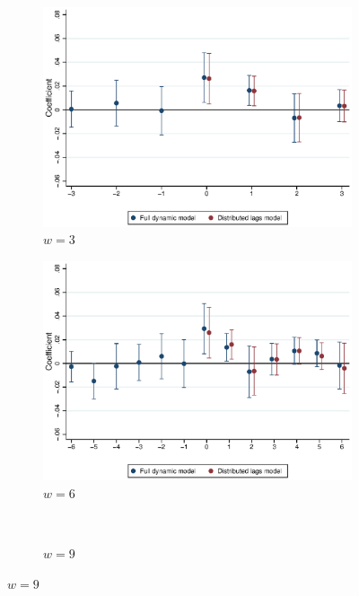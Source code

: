 \documentclass{article}
\begin{document}
\clearpage
\begin{figure}[htb!]
	\caption{Dynamic model: changing window}
	\centering
	\begin{subfigure}[b]{0.5\textwidth}
		\caption{$w=3$}
		\includegraphics[width = \textwidth]
		{../../analysis/first_differences/output/fd_models_coeffs_w3.eps}
	\end{subfigure}%
	\begin{subfigure}[b]{0.5\textwidth}
		\caption{$w=6$}
		\includegraphics[width = \textwidth]
		{../../analysis/first_differences/output/fd_models_coeffs_w6.eps}
	\end{subfigure}\\
	\begin{subfigure}[b]{0.5\textwidth}
		\caption{$w=9$}

\end{subfigure}
\end{figure}
\end{document}
